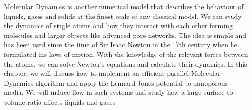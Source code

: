 Molecular Dynamics is another numerical model that describes the behaviour of liquids, gases and solids at the finest scale of any classical model. We can study the dynamics of single atoms and how they interact with each other forming molecules and larger objects like advanced pore networks. The idea is simple and has been used since the time of Sir Isaac Newton in the 17th century when he formulated his laws of motion. With the knowledge of the relevant forces between the atoms, we can solve Newton's equations and calculate their dynamics. In this chapter, we will discuss how to implement an efficient parallel Molecular Dynamics algorithm and apply the Lennard Jones potential to nanoporous media. We will induce flow in such systems and study how a large surface-to-volume ratio affects liquids and gases. 